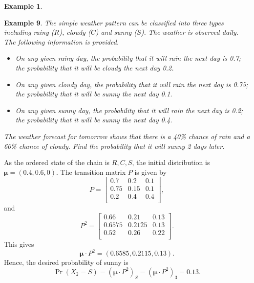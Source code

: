 \documentclass[
]{book}
\theoremstyle{definition}
\theoremstyle{definition}
\newtheorem{example}{Example}[chapter]
\theoremstyle{definition}
\theoremstyle{definition}
\theoremstyle{remark}
\begin{document}
\begin{example}
\protect\hypertarget{exm:weather}{}\label{exm:weather}

\textbf{Example 9}. \emph{The simple weather pattern can be classified into three
types including rainy (\(R\)), cloudy (\(C\)) and sunny (\(S\)). The weather
is observed daily. The following information is provided.}

\begin{itemize}
\item
  \emph{On any given rainy day, the probability that it will rain the next
  day is 0.7; the probability that it will be cloudy the next day
  0.2.}
\item
  \emph{On any given cloudy day, the probability that it will rain the next
  day is 0.75; the probability that it will be sunny the next day
  0.1.}
\item
  \emph{On any given sunny day, the probability that it will rain the next
  day is 0.2; the probability that it will be sunny the next day 0.4.}
\end{itemize}

\emph{The weather forecast for tomorrow shows that there is a 40\% chance of
rain and a 60\% chance of cloudy. Find the probability that it will sunny
2 days later.}

\end{example}

As the ordered state of the chain is \(R, C, S\), the initial distribution
is \(\boldsymbol{\mu} = (0.4, 0.6, 0)\). The transition matrix \(P\) is
given by \[P = \begin{bmatrix}
    0.7 & 0.2 & 0.1    \\
    0.75 & 0.15 & 0.1   \\
    0.2 & 0.4 & 0.4   \\
\end{bmatrix},\] and \[P^2 = \begin{bmatrix}
    0.66 & 0.21 & 0.13    \\
    0.6575 & 0.2125 & 0.13   \\
    0.52 & 0.26 & 0.22   \\
\end{bmatrix}.\] This gives
\[\boldsymbol{\mu} \cdot P^2 = (0.6585,0.2115, 0.13).\] Hence, the
desired probability of sunny is
\[\Pr(X_2 = S) =( \boldsymbol{\mu} \cdot P^2 )_S  = (\boldsymbol{\mu} \cdot P^2 )_3 = 0.13.\]
\end{document}
